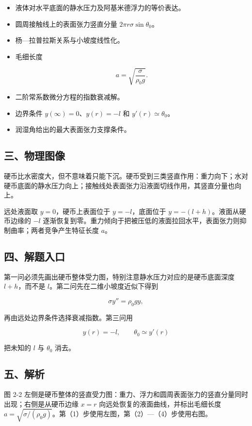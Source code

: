 \documentclass[12pt,a4paper,UTF8]{ctexart}
\begin{document}
\begin{itemize}
\item
  液体对水平底面的静水压力及阿基米德浮力的等价表达。
\item
  圆周接触线上的表面张力竖直分量 \(2\pi r\sigma\sin\theta_0\)。
\item
  杨---拉普拉斯关系与小坡度线性化。
\item
  毛细长度

  \[a=\sqrt{\frac{\sigma}{\rho_0g}}.\]
\item
  二阶常系数微分方程的指数衰减解。
\item
  边界条件 \(y(\infty)=0\)、\(y(r)=-l\) 和 \(y'(r)\simeq\theta_0\)。
\item
  润湿角给出的最大表面张力支撑条件。
\end{itemize}

\subsection{三、物理图像}\label{ux4e09ux7269ux7406ux56feux50cf-1}

硬币比水密度大，但不意味着只能下沉。硬币受到三类竖直作用：重力向下；水对硬币底面的静水压力向上；接触线处表面张力沿液面切线作用，其竖直分量也向上。

远处液面取 \(y=0\)，硬币上表面位于 \(y=-l\)，底面位于
\(y=-(l+h)\)。液面从硬币边缘的 \(-l\)
逐渐恢复到零。重力倾向于把被压低的液面拉回水平，表面张力则抑制曲率；两者竞争产生特征长度
\(a\)。

\subsection{四、解题入口}\label{ux56dbux89e3ux9898ux5165ux53e3-1}

第一问必须先画出硬币整体受力图，特别注意静水压力对应的是硬币底面深度
\(l+h\)，而不是 \(l\)。第二问先在二维小坡度近似下得到

\[\sigma y''=\rho_0gy,\]

再由远处边界条件选择衰减指数。第三问用

\[y(r)=-l,
\qquad
\theta_0\simeq y'(r)
\]

把未知的 \(l\) 与 \(\theta_0\) 消去。

\subsection{五、解析}\label{ux4e94ux89e3ux6790-1}

图 2-2
左侧是硬币整体的竖直受力图：重力、浮力和圆周表面张力的竖直分量同时出现；右侧是从硬币边缘
\(x=r\) 向远处恢复的液面曲线，并标出毛细长度
\(a=\sqrt{\sigma/(\rho_0g)}\)。第（1）步使用左图，第（2）---（4）步使用右图。
\end{document}

